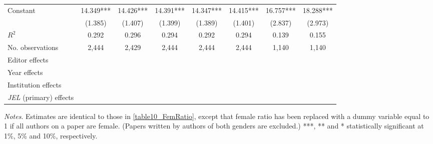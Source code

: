 \begin{table}
\begin{adjustwidth}{-0.085cm}{}
\begin{threeparttable}
\begin{tabular}{p{2.64cm}SSSSSSS}
            Constant                      &      14.349***&      14.426***&      14.391***&      14.347***&      14.415***&      16.757***&      18.288***\\
                                          &     (1.385)   &     (1.407)   &     (1.399)   &     (1.389)   &     (1.401)   &     (2.837)   &     (2.973)   \\
            \midrule
            \(R^2\)                       &       0.292   &       0.296   &       0.294   &       0.292   &       0.294   &       0.139   &       0.155   \\
            No. observations              &       2,444   &       2,429   &       2,444   &       2,444   &       2,444   &       1,140   &       1,140   \\
            \midrule
            Editor effects       &           {}   &           {}   &           {}   &           {}   &           {}   &           {}   &           {}   \\
            Year effects                  &           {}   &           {}   &           {}   &           {}   &           {}   &           {}   &           {}   \\
            Institution effects           &           {}   &           {}   &           {}   &           {}   &           {}   &           {}   &           {}   \\
            \textit{JEL} (primary) effects&               &               &               &               &               &               &           {}   \\
            \bottomrule
        \end{tabular}
        \begin{tablenotes}
            \tiny
            \item \textit{Notes}. Estimates are identical to those in \autoref{table10_FemRatio}, except that female ratio has been replaced with a dummy variable equal to 1 if all authors on a paper are female. (Papers written by authors of both genders are excluded.) ***, ** and * statistically significant at 1\%, 5\% and 10\%, respectively.
        \end{tablenotes}
    \end{threeparttable}
    \end{adjustwidth}
\end{table}